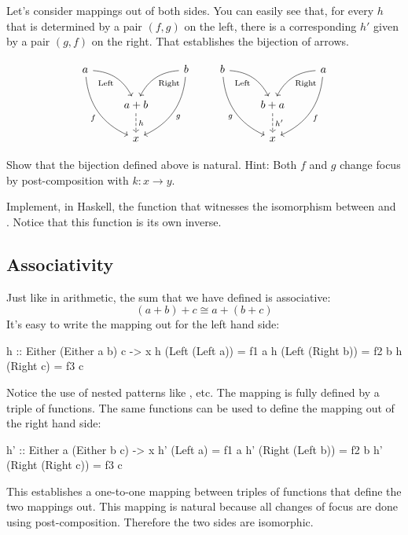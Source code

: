 \documentclass[DaoFP]{subfiles}
\begin{document}
Let's consider mappings out of both sides. You can easily see that, for every $h$ that is determined by a pair $(f, g)$ on the left, there is a corresponding $h'$ given by a pair $(g, f)$ on the right. That establishes the bijection of arrows.

\[
 \begin{tikzcd}
 a
 \arrow[dr,  bend left, "\text{Left}"']
 \arrow[ddr, bend right, "f"']
 && b
 \arrow[dl, bend right, "\text{Right}"]
 \arrow[ddl, bend left, "g"]
 \\
&a + b
\arrow[d, dashed, "h"]
\\
& x
 \end{tikzcd}
 \qquad
 \begin{tikzcd}
 b
 \arrow[dr,  bend left, "\text{Left}"']
 \arrow[ddr, bend right, "g"']
 && a
 \arrow[dl, bend right, "\text{Right}"]
 \arrow[ddl, bend left, "f"]
 \\
&b + a
\arrow[d, dashed, "h'"]
\\
& x
 \end{tikzcd}
\]

\begin{exercise}
Show that the bijection defined above is natural. Hint: Both $f$ and $g$ change focus by post-composition with $k \colon x \to y$.
\end{exercise}
\begin{exercise}
Implement, in Haskell, the function that witnesses the isomorphism between  and . Notice that this function is its own inverse.
\end{exercise}

\subsection{Associativity}

Just like in arithmetic, the sum that we have defined is associative:
\[(a + b) + c \cong a + (b + c) \]
It's easy to write the mapping out for the left hand side:
\begin{haskell}
h :: Either (Either a b) c -> x
h (Left (Left a))  = f1 a
h (Left (Right b)) = f2 b
h (Right c)        = f3 c
\end{haskell}
Notice the use of nested patterns like , etc. The mapping is fully defined by a triple of functions. The same functions can be used to define the mapping out of the right hand side:
\begin{haskell}
h' :: Either a (Either b c) -> x
h' (Left a)          = f1 a
h' (Right (Left b))  = f2 b
h' (Right (Right c)) = f3 c
\end{haskell}
This establishes a one-to-one mapping between triples of functions that define the two mappings out. This mapping is natural because all changes of focus are done using post-composition. Therefore the two sides are isomorphic.
\end{document}
